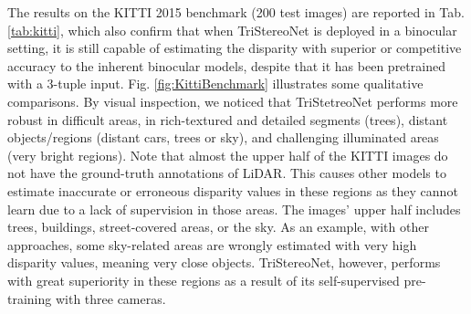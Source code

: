 \documentclass[10pt,twocolumn,letterpaper]{article}
\begin{document}
The results on the KITTI 2015 benchmark (200 test images) are reported in Tab. \ref{tab:kitti}, which also confirm that when TriStereoNet is deployed in a binocular setting, it is still capable of estimating the disparity with superior or competitive accuracy to the inherent binocular models, despite that it has been pretrained with a 3-tuple input. Fig. \ref{fig:KittiBenchmark} illustrates some qualitative comparisons. By visual inspection, we noticed that TriStetreoNet performs more robust in difficult areas, \ie in rich-textured and detailed segments (\eg trees), distant objects/regions (\eg distant cars, trees or sky), and challenging illuminated areas (\eg very bright regions). Note that almost the upper half of the KITTI images do not have the ground-truth annotations of LiDAR. This causes other models to estimate inaccurate or erroneous disparity values in these regions as they cannot learn due to a lack of supervision in those areas. The images' upper half includes trees, buildings, street-covered areas, or the sky. As an example, with other approaches, some sky-related areas are wrongly estimated with very high disparity values, meaning very close objects. TriStereoNet, however, performs with great superiority in these regions as a result of its self-supervised pre-training with three cameras.
\end{document}
